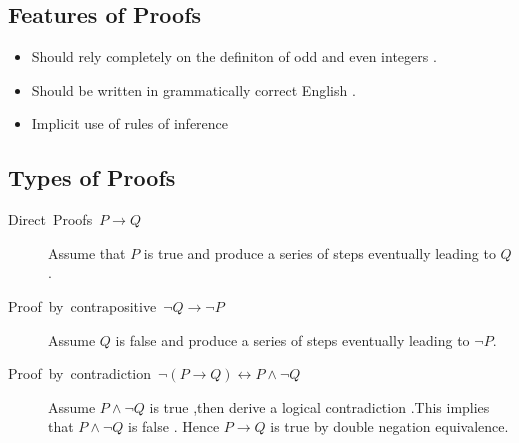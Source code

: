 \documentclass[a4paper,english]{article}
\begin{document}
\subsection{Features of Proofs}
\begin{itemize}
\item Should rely completely on the definiton of odd and even integers .
\item Should be written in grammatically correct English .
\item Implicit use of rules of inference
\end{itemize}

\subsection{Types of Proofs }
\begin{description}
\item [{Direct~Proofs~$P\rightarrow Q$}] Assume that $P$ is true and
produce a series of steps eventually leading to $Q$.
\item [{Proof~by~contrapositive~$\lnot Q\rightarrow\lnot P$}] Assume
$Q$ is false and produce a series of steps eventually leading to
$\lnot P$.
\item [{Proof~by~contradiction~$\lnot(P\rightarrow Q)\leftrightarrow P\wedge\lnot Q$}] Assume
$P\wedge\lnot Q$ is true ,then derive a logical contradiction .This
implies that $P\wedge\lnot Q$ is false . Hence $P\rightarrow Q$
is true by double negation equivalence.\end{description}
\end{document}
